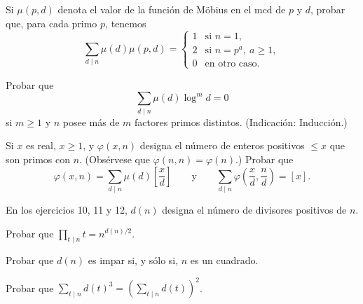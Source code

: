 \documentclass[12pt,a4paper]{book}
\begin{document}
    \begin{ejercicio}
        Si $\mu(p,d)$ denota el valor de la función de Möbius en el mcd de $p$ y $d$,
        probar que, para cada primo $p$, tenemos
        \begin{equation*}
            \sum_{d\mid n}\mu(d)\mu(p,d)=
            \begin{cases}
                1 & \text{si } n=1,\\
                2 & \text{si } n=p^{a},\ a\geq1,\\
                0 & \text{en otro caso.}
            \end{cases}
        \end{equation*}
    \end{ejercicio}

    \begin{ejercicio}
        Probar que
        \begin{equation*}
            \sum_{d\mid n}\mu(d)\log^{m} d=0
        \end{equation*}
        si $m\geq1$ y $n$ posee más de $m$ factores primos distintos. (Indicación:
        Inducción.)
    \end{ejercicio}

    \begin{ejercicio}
        Si $x$ es real, $x\geq1$, y $\varphi(x,n)$ designa el número de enteros positivos
        $\leq x$ que son primos con $n$. (Obsérvese que $\varphi(n,n)=\varphi(n)$.) Probar
        que
        \begin{equation*}
            \varphi(x,n)=\sum_{d\mid n}\mu(d)\left[\frac{x}{d}\right]\qquad\text{y}\qquad
            \sum_{d\mid n}\varphi\left(\frac{x}{d},\frac{n}{d}\right)=[x].
        \end{equation*}
    \end{ejercicio}

    En los ejercicios 10, 11 y 12, $d(n)$ designa el número de divisores positivos de $n$.

    \begin{ejercicio}
        Probar que $\prod_{t\mid n}t=n^{d(n)/2}$.
    \end{ejercicio}

    \begin{ejercicio}
        Probar que $d(n)$ es impar si, y sólo si, $n$ es un cuadrado.
    \end{ejercicio}

    \begin{ejercicio}
        Probar que $\sum_{t\mid n}d(t)^{3}=\left(\sum_{t\mid n}d(t)\right)^{2}$.
    \end{ejercicio}
\end{document}
